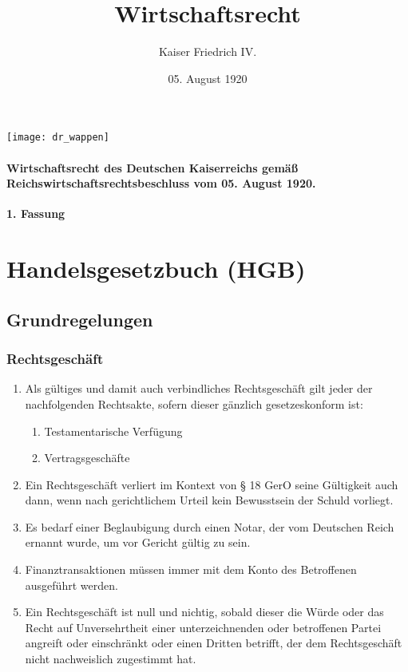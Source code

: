 \documentclass{article}
\title{Wirtschaftsrecht}
\author{Kaiser Friedrich IV.}
\date{05. August 1920}
\begin{document}
\maketitle
\begin{center}
    \texttt{[image: dr\_wappen]}
\end{center}
\vspace*{\fill}
\paragraph{Wirtschaftsrecht des Deutschen Kaiserreichs gemäß Reichswirtschaftsrechtsbeschluss vom 05. August 1920.}
\newpage
\newpage
{}
\vspace*{\fill}
\begin{Center}
\textbf{1. Fassung}
\vspace*{\fill}
\end{Center}
\newpage
\tableofcontents
\newpage
\section{Handelsgesetzbuch (HGB)}
\localtableofcontents
\subsection{Grundregelungen}
\subsubsection{Rechtsgeschäft}\label{rechtsg}
\begin{enumerate}[(1)]
    \item Als gültiges und damit auch verbindliches Rechtsgeschäft gilt jeder der nachfolgenden Rechtsakte, sofern dieser gänzlich gesetzeskonform ist:
    \begin{enumerate}[1.]
        \item Testamentarische Verfügung
        \item Vertragsgeschäfte
    \end{enumerate}
    \item Ein Rechtsgeschäft verliert im Kontext von § 18 GerO seine Gültigkeit auch dann, wenn nach gerichtlichem Urteil kein Bewusstsein der Schuld vorliegt.
    \item Es bedarf einer Beglaubigung durch einen Notar, der vom Deutschen Reich ernannt wurde, um vor Gericht gültig zu sein.
    \item Finanztransaktionen müssen immer mit dem Konto des Betroffenen ausgeführt werden.
    \item Ein Rechtsgeschäft ist null und nichtig, sobald dieser die Würde oder das Recht auf Unversehrtheit einer unterzeichnenden oder betroffenen Partei angreift oder einschränkt oder einen Dritten betrifft, der dem Rechtsgeschäft nicht nachweislich zugestimmt hat.
\end{enumerate}
\end{document}
